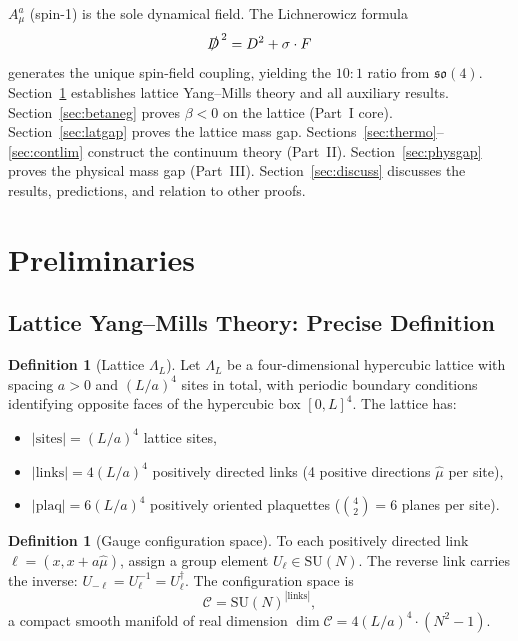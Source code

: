 \documentclass[12pt,a4paper]{article}
\theoremstyle{plain}
\theoremstyle{definition}
\newtheorem{definition}[theorem]{Definition}
\theoremstyle{remark}
\begin{document}
$A_\mu^a$ (spin-1) is the sole dynamical field. The Lichnerowicz formula
\begin{equation}\label{eq:Lich}
\slashed{D}^{\,2}=D^2+\sigma\cdot F
\end{equation}
generates the unique spin-field coupling, yielding the $10{:}1$ ratio from $\mathfrak{so}(4)$.
Section~\ref{sec:prelim} establishes lattice Yang--Mills theory and all auxiliary results. Section~\ref{sec:betaneg} proves $\beta<0$ on the lattice (Part~I core). Section~\ref{sec:latgap} proves the lattice mass gap. Sections~\ref{sec:thermo}--\ref{sec:contlim} construct the continuum theory (Part~II). Section~\ref{sec:physgap} proves the physical mass gap (Part~III). Section~\ref{sec:discuss} discusses the results, predictions, and relation to other proofs.

\section{Preliminaries}\label{sec:prelim}

\subsection{Lattice Yang--Mills Theory: Precise Definition}\label{sec:lattice}

\begin{definition}[Lattice $\Lambda_L$]\label{def:lattice}
Let $\Lambda_L$ be a four-dimensional hypercubic lattice with spacing $a>0$ and $(L/a)^4$ sites in total, with periodic boundary conditions identifying opposite faces of the hypercubic box $[0,L]^4$. The lattice has:
\begin{itemize}[nosep]
\item $|\mathrm{sites}| = (L/a)^4$ lattice sites,
\item $|\mathrm{links}| = 4(L/a)^4$ positively directed links (4 positive directions $\hat\mu$ per site),
\item $|\mathrm{plaq}| = 6(L/a)^4$ positively oriented plaquettes ($\binom{4}{2}=6$ planes per site).
\end{itemize}
\end{definition}

\begin{definition}[Gauge configuration space]\label{def:config}
To each positively directed link $\ell = (x, x+a\hat{\mu})$, assign a group element $U_\ell \in \mathrm{SU}(N)$. The reverse link carries the inverse: $U_{-\ell} = U_\ell^{-1} = U_\ell^\dagger$. The configuration space is
\begin{equation}\label{eq:config}
\mathcal{C} = \mathrm{SU}(N)^{|\mathrm{links}|},
\end{equation}
a compact smooth manifold of real dimension $\dim\mathcal{C} = 4(L/a)^4 \cdot (N^2-1)$.
\end{definition}
\end{document}
